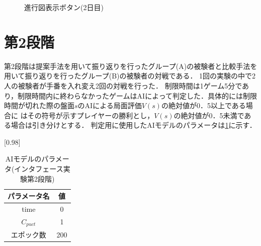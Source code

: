 \begin{figure}[htbp]
    \centering
    \setlength{\fboxsep}{1pt} %
    \setlength{\fboxrule}{1pt} %
    \caption{進行図表示ボタン(2日目)}
	\label{fig:best-worst}
\end{figure}

\section{第2段階}
第2段階は提案手法を用いて振り返りを行ったグループ(A)の被験者と比較手法を用いて振り返りを行ったグループ(B)の被験者の対戦である．
1回の実験の中で2人の被験者が手番を入れ変え2回の対戦を行った．
制限時間は1ゲーム5分であり，制限時間内に終わらなかったゲームはAIによって判定した．具体的には制限時間が切れた際の盤面$s$のAIによる局面評価$V(s)$の絶対値が0．5以上である場合に
はその符号が示すプレイヤーの勝利とし，$V(s)$の絶対値が0．5未満である場合は引き分けとする．
判定用に使用したAIモデルのパラメータは\ref{table:param-judge}に示す．
\begin{table}[H]
	\caption{AIモデルのパラメータ(インタフェース実験第2段階)}
    \label{table:param-judge}
	\centering
	\scalebox{0.98}[0.98]{
		\begin{tabular}{c|c}
			パラメータ名 & 値 \\ \hline
			time    & 0\\ 
			$C_{puct}$    & 1 \\
            エポック数 & 200 \\
		\end{tabular}
	}
	
\end{table}


